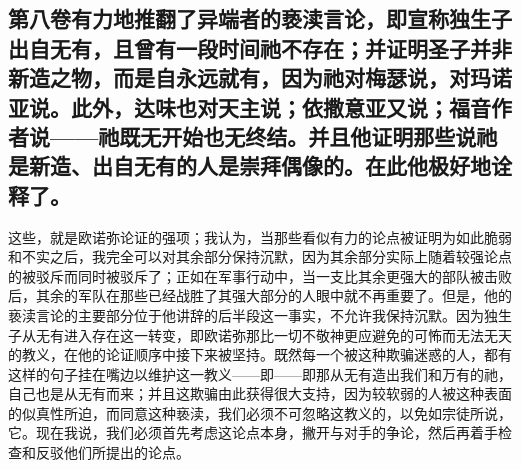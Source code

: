 
\subsection{第八卷有力地推翻了异端者的亵渎言论，即宣称独生子出自无有，且曾有一段时间祂不存在；并证明圣子并非新造之物，而是自永远就有，因为祂对梅瑟说，对玛诺亚说。此外，达味也对天主说；依撒意亚又说；福音作者说——祂既无开始也无终结。并且他证明那些说祂是新造、出自无有的人是崇拜偶像的。在此他极好地诠释了。}

这些，就是欧诺弥论证的强项；我认为，当那些看似有力的论点被证明为如此脆弱和不实之后，我完全可以对其余部分保持沉默，因为其余部分实际上随着较强论点的被驳斥而同时被驳斥了；正如在军事行动中，当一支比其余更强大的部队被击败后，其余的军队在那些已经战胜了其强大部分的人眼中就不再重要了。但是，他的亵渎言论的主要部分位于他讲辞的后半段这一事实，不允许我保持沉默。因为独生子从无有进入存在这一转变，即欧诺弥那比一切不敬神更应避免的可怖而无法无天的教义，在他的论证顺序中接下来被坚持。既然每一个被这种欺骗迷惑的人，都有这样的句子挂在嘴边以维护这一教义——即——即那从无有造出我们和万有的祂，自己也是从无有而来；并且这欺骗由此获得很大支持，因为较软弱的人被这种表面的似真性所迫，而同意这种亵渎，我们必须不可忽略这教义的，以免如宗徒所说，它。现在我说，我们必须首先考虑这论点本身，撇开与对手的争论，然后再着手检查和反驳他们所提出的论点。\par

